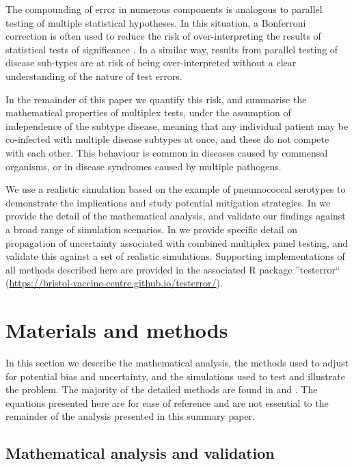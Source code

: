 \documentclass[10pt,letterpaper]{article}
\begin{document}
The compounding of error in numerous components is analogous to parallel testing of multiple statistical hypotheses. In this situation, a Bonferroni correction is often used to reduce the risk of over-interpreting the results of statistical tests of significance \cite{shaffer1995}. In a similar way, results from parallel testing of disease sub-types are at risk of being over-interpreted without a clear understanding of the nature of test errors.

In the remainder of this paper we quantify this risk, and summarise the mathematical properties of multiplex tests, under the assumption of independence of the subtype disease, meaning that any individual patient may be co-infected with multiple disease subtypes at once, and these do not compete with each other. This behaviour is common in diseases caused by commensal organisms, or in disease syndromes caused by multiple pathogens.

We use a realistic simulation based on the example of pneumococcal serotypes to demonstrate the implications and study potential mitigation strategies. In  we provide the detail of the mathematical analysis, and validate our findings against a broad range of simulation scenarios. In  we provide specific detail on propagation of uncertainty associated with combined multiplex panel testing, and validate this against a set of realistic simulations. Supporting implementations of all methods described here are provided in the associated R package ''testerror`` (\url{https://bristol-vaccine-centre.github.io/testerror/}).

\section*{Materials and methods}

In this section we describe the mathematical analysis, the methods used to adjust for potential bias and uncertainty, and the simulations used to test and illustrate the problem. The majority of the detailed methods are found in  and . The equations presented here are for ease of reference and are not essential to the remainder of the analysis presented in this summary paper.

\subsection*{Mathematical analysis and validation}
\end{document}
